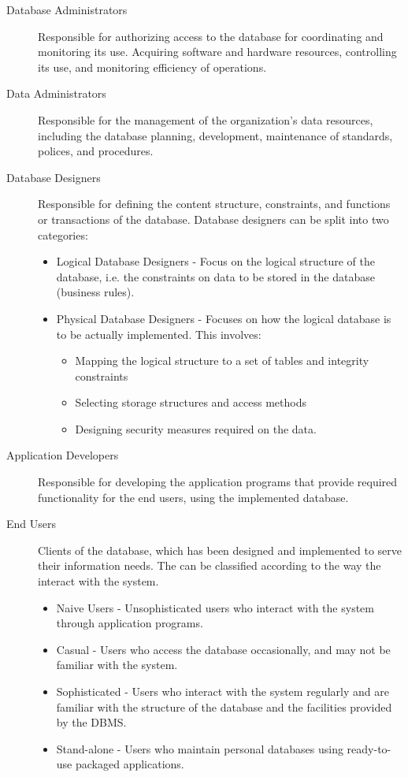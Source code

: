 \documentclass[12pt letter]{report}
\begin{document}
\begin{description}
  \item[Database Administrators] Responsible for authorizing access to the database for coordinating and monitoring its
        use. Acquiring software and hardware resources, controlling its use, and monitoring efficiency of operations.
  \item[Data Administrators] Responsible for the management of the organization's data resources, including the
        database planning, development, maintenance of standards, polices, and procedures.
  \item [Database Designers] Responsible for defining the content structure, constraints, and functions or transactions of
        the database. Database designers can be split into two categories:
        \begin{itemize}
          \item Logical Database Designers - Focus on the logical structure of the database, i.e. the constraints on
                data to be stored in the database (business rules).
          \item Physical Database Designers - Focuses on how the logical database is to be actually implemented. This
                involves:
                \begin{itemize}
                  \item Mapping the logical structure to a set of tables and integrity constraints
                  \item Selecting storage structures and access methods
                  \item Designing security  measures required on the data.
                \end{itemize}
        \end{itemize}
  \item[Application Developers] Responsible for developing the application programs that provide required
        functionality for the end users, using the implemented database.
  \item[End Users] Clients of the database, which has been designed and implemented to serve their information needs.
        The can be classified according to the way the interact with the system.
        \begin{itemize}
          \item Naive Users - Unsophisticated users who interact with the system through application programs.
          \item Casual - Users who access the database occasionally, and may not be familiar with the system.
          \item Sophisticated - Users who interact with the system regularly and are familiar with the structure of the
                database and the facilities provided by the DBMS.
          \item Stand-alone - Users who maintain personal databases using ready-to-use packaged applications.
        \end{itemize}
\end{description}
\end{document}
